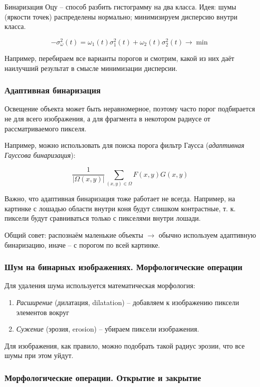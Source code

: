 \documentclass[main.tex]{subfiles}
\begin{document}
Бинаризация Оцу -- способ разбить гистограмму на два класса.
Идея: шумы (яркости точек) распределены нормально; минимизируем дисперсию внутри класса.

$$ - \sigma_\omega^2(t) = \omega_1(t)\sigma_1^2(t) + \omega_2(t) \sigma_2^2(t) \to \min $$

Например, перебираем все варианты порогов и смотрим, какой из них даёт наилучший результат в смысле минимизации дисперсии.

\subsubsection{Адаптивная бинаризация}

Освещение объекта может быть неравномерное, поэтому часто порог подбирается не для всего изображения, а для фрагмента в некотором радиусе от рассматриваемого пикселя.

Например, можно использовать для поиска порога фильтр Гаусса (\emph{адаптивная Гауссова бинаризация}):

$$ \frac{1}{| \Omega (x, y) |} \sum_{(x,y) \in \Omega} F(x,y)G(x,y) $$

Важно, что адаптивная бинаризация тоже работает не всегда.
Например, на картинке с лошадью области внутри коня будут слишком контрастные, т. к. пиксели будут сравниваться только с пикселями внутри лошади.

Общий совет: распознаём маленькие объекты $ \to $ обычно используем адаптивную бинаризацию, иначе -- с порогом по всей картинке.

\subsubsection{Шум на бинарных изображениях. Морфологические операции}

Для удаления шума используется математическая морфология:

\begin{enumerate}[noitemsep]
	\item \emph{Расширение} (дилатация, dilatation) -- добавляем к изображению пиксели элементов вокруг
	\item \emph{Сужение} (эрозия, erosion) -- убираем пиксели изображения.
\end{enumerate}

Для изображения, как правило, можно подобрать такой радиус эрозии, что все шумы при этом уйдут.

\subsubsection{Морфологические операции. Открытие и закрытие}
\end{document}
